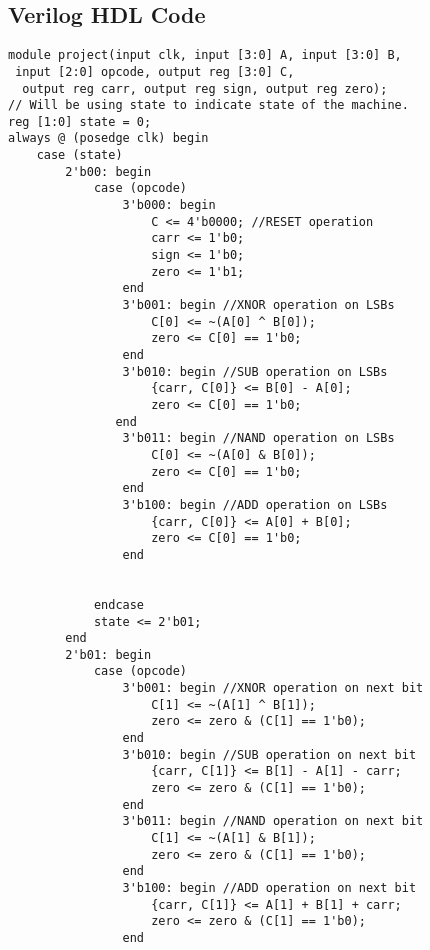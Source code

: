 
\subsection{Verilog HDL Code}\label{subsec:verilog-hdl-code}
\begin{lstlisting}[style=verilogStyle, caption={Verilog code for 4-bit ALU},label={lst:lstlisting}]
module project(input clk, input [3:0] A, input [3:0] B,
 input [2:0] opcode, output reg [3:0] C,
  output reg carr, output reg sign, output reg zero);
// Will be using state to indicate state of the machine.
reg [1:0] state = 0;
always @ (posedge clk) begin
    case (state)
        2'b00: begin
            case (opcode)
                3'b000: begin
                    C <= 4'b0000; //RESET operation
                    carr <= 1'b0;
                    sign <= 1'b0;
                    zero <= 1'b1;
                end
                3'b001: begin //XNOR operation on LSBs
                    C[0] <= ~(A[0] ^ B[0]);
                    zero <= C[0] == 1'b0;
                end
                3'b010: begin //SUB operation on LSBs
                    {carr, C[0]} <= B[0] - A[0];
                    zero <= C[0] == 1'b0;
               end
                3'b011: begin //NAND operation on LSBs
                    C[0] <= ~(A[0] & B[0]);
                    zero <= C[0] == 1'b0;
                end
                3'b100: begin //ADD operation on LSBs
                    {carr, C[0]} <= A[0] + B[0];
                    zero <= C[0] == 1'b0;
                end


            endcase
            state <= 2'b01;
        end
        2'b01: begin
            case (opcode)
                3'b001: begin //XNOR operation on next bit
                    C[1] <= ~(A[1] ^ B[1]);
                    zero <= zero & (C[1] == 1'b0);
                end
                3'b010: begin //SUB operation on next bit
                    {carr, C[1]} <= B[1] - A[1] - carr;
                    zero <= zero & (C[1] == 1'b0);
                end
                3'b011: begin //NAND operation on next bit
                    C[1] <= ~(A[1] & B[1]);
                    zero <= zero & (C[1] == 1'b0);
                end
                3'b100: begin //ADD operation on next bit
                    {carr, C[1]} <= A[1] + B[1] + carr;
                    zero <= zero & (C[1] == 1'b0);
                end



\end{lstlisting}
